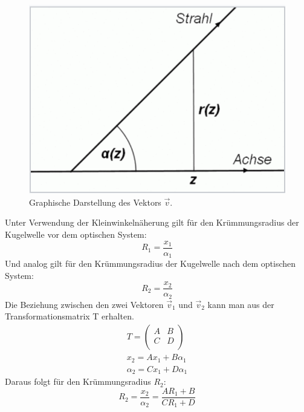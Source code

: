 \begin{figure}[h]
    \centering
    \includegraphics[scale=0.4]{Bilder/FzV/gaus.png}
    \caption{Graphische Darstellung des Vektors $\vec{v}$. }
\end{figure}
Unter Verwendung der Kleinwinkelnäherung gilt für den Krümmungsradius der Kugelwelle vor dem optischen System:
\begin{equation}
    R_1 = \frac{x_1}{\alpha_1}
\end{equation}
Und analog gilt für den Krümmungsradius der Kugelwelle nach dem optischen System:
\begin{equation}
    R_2 = \frac{x_2}{\alpha_2}
\end{equation}
Die Beziehung zwischen den zwei Vektoren $\vec{v}_1$ und $\vec{v}_2$ kann man aus der Transformationsmatrix T erhalten. \citep[vgl.][]{optik} \\
\begin{align}
    T = \left(\begin{array}{rr} 
    A & B  \\ 
    C & D \\ 
    \end{array}\right)\\
    x_2 = Ax_1 + B\alpha_1\\
    \alpha_2 = Cx_1 + D\alpha_1
\end{align}
Daraus folgt für den Krümmungsradius $R_2$:
\begin{equation}
    R_2  = \frac{x_2}{\alpha_2} = \frac{AR_1 + B}{C R_1 + D}
\end{equation}
\newpage
